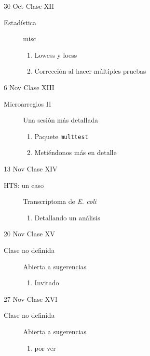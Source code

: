 \documentclass[letterpaper,12pt]{article}
\newcommand{\pl}[1]{\texttt{#1}}
\begin{document}
\begin{itemize}
  \item[30 Oct] Clase XII
  \begin{description}
  \item[Estadística] misc
  \begin{enumerate}
  \item Lowess y loess
  \item Corrección al hacer múltiples pruebas
  \end{enumerate}
  \end{description}
  
  \item[6 Nov] Clase XIII
  \begin{description}
  \item[Microarreglos II] Una sesión más detallada
  \begin{enumerate}
  \item Paquete \pl{multtest}
  \item Metiéndonos más en detalle
  \end{enumerate}
  \end{description}  
    
  \item[13 Nov] Clase XIV
  \begin{description}
  \item[HTS: un caso] Transcriptoma de \emph{E. coli}
  \begin{enumerate}
  \item Detallando un análisis
  \end{enumerate}
  \end{description}
  
  \item[20 Nov] Clase XV
  \begin{description}
  \item[Clase no definida] Abierta a sugerencias
  \begin{enumerate}
  \item Invitado
  \end{enumerate}
  \end{description}
    
  \item[27 Nov] Clase XVI
  \begin{description}
  \item[Clase no definida] Abierta a sugerencias
  \begin{enumerate}
  \item por ver
  \end{enumerate}
  \end{description}
  

\end{itemize}
\end{document}
